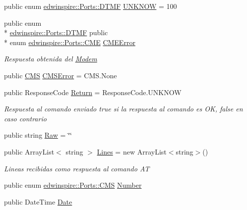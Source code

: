 \begin{DoxyCompactItemize}
\item 
public enum \hyperlink{namespaceedwinspire_1_1Ports_a64c52d3ccbb1de87e21d107a90581048}{edwinspire\-::\-Ports\-::\-D\-T\-M\-F} \hyperlink{namespaceedwinspire_1_1Ports_ab4d6b4e5fffd7740bd68fd1594b67205}{U\-N\-K\-N\-O\-W} = 100
\item 
public enum \\*
\hyperlink{namespaceedwinspire_1_1Ports_a64c52d3ccbb1de87e21d107a90581048}{edwinspire\-::\-Ports\-::\-D\-T\-M\-F} public \\*
enum \hyperlink{namespaceedwinspire_1_1Ports_a791799a5b274b8e0c84444482227c033}{edwinspire\-::\-Ports\-::\-C\-M\-E} \hyperlink{namespaceedwinspire_1_1Ports_a74ee8bbe692036a9613256844c74bb50}{C\-M\-E\-Error}
\begin{DoxyCompactList}\small\item\em Respuesta obtenida del \hyperlink{classedwinspire_1_1Ports_1_1Modem}{Modem} \end{DoxyCompactList}\item 
public \hyperlink{namespaceedwinspire_1_1Ports_a0bdbe3cdc235c877ebd86d6a0d36b489}{C\-M\-S} \hyperlink{namespaceedwinspire_1_1Ports_ac087f2314d763ec62e02b62df2b34571}{C\-M\-S\-Error} = C\-M\-S.\-None
\item 
public Response\-Code \hyperlink{namespaceedwinspire_1_1Ports_ab2f8774e65906dad0a298c764f0737df}{Return} = Response\-Code.\-U\-N\-K\-N\-O\-W
\begin{DoxyCompactList}\small\item\em Respuesta al comando enviado true si la respuesta al comando es O\-K, false en caso contrario \end{DoxyCompactList}\item 
public string \hyperlink{namespaceedwinspire_1_1Ports_af811d776374cb560b42972cd1f1d4f61}{Raw} = \char`\"{}\char`\"{}
\item 
public Array\-List$<$ string $>$ \hyperlink{namespaceedwinspire_1_1Ports_a52dc2afb8cadb65ffcdf4d5c1e37a3cf}{Lines} = new Array\-List$<$string$>$()
\begin{DoxyCompactList}\small\item\em Lineas recibidas como respuesta al comando A\-T \end{DoxyCompactList}\item 
public enum \hyperlink{namespaceedwinspire_1_1Ports_a0bdbe3cdc235c877ebd86d6a0d36b489}{edwinspire\-::\-Ports\-::\-C\-M\-S} \hyperlink{namespaceedwinspire_1_1Ports_a45a12d9b3e1b045369ee6b3602c231f2}{Number}
\item 
public Date\-Time \hyperlink{namespaceedwinspire_1_1Ports_a85143858f34117053e5460d22df04df8}{Date}

\end{DoxyCompactItemize}
